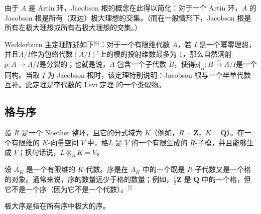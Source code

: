 由于 $A$ 是 Artin 环，Jacobson 根的概念在此得以简化：对于一个 Artin 环，$A$ 的 Jacobson 根是所有（双边）极大理想的交集。（而在一般情形下，Jacobson 根是所有左极大理想或所有右极大理想的交集。）

Wedderburn 主定理陈述如下\(^\text{[6]}\)：对于一个有限维代数 $A$，若 $I$ 是一个幂零理想，并且$A / I$作为包络代数$(A / I)^e$上的模的投射维数最多为 1，那么自然满射$p : A \to A / I$是分裂的；也就是说，$A$ 包含一个子代数 $B$，使得$p|_B : B \xrightarrow{\sim} A / I$是一个同构。当取 $I$ 为 Jacobson 根时，该定理特别说明：Jacobson 根与一个半单代数互补。此定理是李代数的 Levi 定理 的一个类似物。
\subsection{格与序}
设 $R$ 是一个 Noether 整环，且它的分式域为 $K$（例如，$R = \mathbf{Z}$，$K = \mathbf{Q}$）。在一个有限维的 $K$-向量空间 $V$ 中，格$L$ 是 $V$ 的一个有限生成的 $R$-子模，并且能够生成 $V$；换句话说，$L \otimes_R K = V$。

设 $A_K$ 是一个有限维的 $K$-代数。序是在 $A_K$ 中的一个既是 $R$-子代数又是一个格的对象。通常来说，序的数量远少于格的数量；例如，$\frac{1}{2} \mathbf{Z}$ 是 $\mathbf{Q}$ 中的一个格，但它不是一个序（因为它不是一个代数）。\(^\text{[7]}\)

极大序是指在所有序中极大的序。
